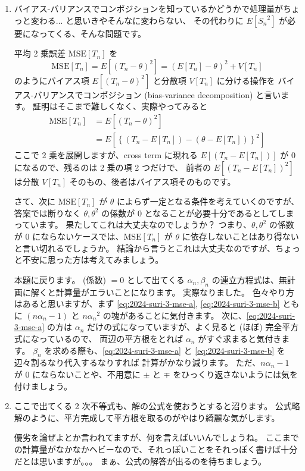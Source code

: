 \documentclass[./main.tex]{subfiles}
\begin{document}
\begin{enumerate}
        \item バイアス-バリアンスでコンポジションを知っているかどうかで処理量がちょっと変わる... と思いきやそんなに変わらない、
        その代わりに $E[ {S_n}^2]$ が必要になってくる、そんな問題です。

        平均 2 乗誤差 $\mathrm{MSE} [T_n]$ を
        \begin{equation*}
            \mathrm{MSE} [T_n] 
                = E [ (T_n - \theta)^2 ] 
                    = ( E [ T_n] - \theta )^2 + V [T_n]
        \end{equation*}
        のようにバイアス項 $E [ (T_n - \theta)^2 ]$ と分散項 $V [T_n]$ に分ける操作を バイアス-バリアンスでコンポジション (bias-variance decomposition) と言います。
        証明はそこまで難しくなく、実際やってみると
        \begin{align*}
            \mathrm{MSE} [T_n] 
                &= E [ (T_n - \theta)^2 ] \\
                &= E \left[ \left\{ (T_n - E[ T_n ]) - (\theta - E[ T_n]) \right\}^2 \right]
        \end{align*}
        ここで 2 乗を展開しますが、cross term に現れる $E[ ( T_n - E [T_n] ) ]$ が $0$ になるので、残るのは 2 乗の項 2 つだけで、
        前者の $E [ (T_n - E[T_n])^2 ]$ は分散 $V [T_n]$ そのもの、後者はバイアス項そのものです。

        さて、次に $\mathrm{MSE} [T_n]$ が $\theta$ によらず一定となる条件を考えていくのですが、
        答案では断りなく $\theta, \theta^2$ の係数が $0$ となることが必要十分であるとしてしまっています。
        果たしてこれは大丈夫なのでしょうか？
        つまり、$\theta, \theta^2$ の係数が $0$ にならないケースでは、$\mathrm{MSE} [T_n]$ が $\theta$ に依存しないことはあり得ないと言い切れるでしょうか。
        結論から言うとこれは大丈夫なのですが、ちょっと不安に思った方は考えてみましょう。

        本題に戻ります。
        (係数) $= 0 $ として出てくる $\alpha_n, \beta_n$ の連立方程式は、無計画に解くと計算量がエラいことになります。
        実際なりました。
        色々やり方はあると思いますが、まず \eqref{eq:2024-suri-3-mse-a}, \eqref{eq:2024-suri-3-mse-b} ともに
        $(n \alpha_n - 1)$ と $n {\alpha_n}^2$ の塊があることに気付きます。
        次に、\eqref{eq:2024-suri-3-mse-a} の方は $\alpha_n$ だけの式になっていますが、よく見ると (ほぼ) 完全平方式になっているので、
        両辺の平方根をとれば $\alpha_n$ がすぐ求まると気付きます。
        $\beta_n$ を求める際も、\eqref{eq:2024-suri-3-mse-a} と \eqref{eq:2024-suri-3-mse-b} を辺々割るなり代入するなりすれば
        計算がかなり減ります。
        ただ、$n \alpha_n - 1$ が $0$ にならないことや、不用意に $\pm$ と $\mp$ をひっくり返さないようには気を付けましょう。

        \item ここで出てくる 2 次不等式も、解の公式を使おうとすると沼ります。
        公式略解のように、平方完成して平方根を取るのがやはり綺麗な気がします。

        優劣を論ぜよとか言われてますが、何を言えばいいんでしょうね。
        ここまでの計算量がなかなかヘビーなので、それっぽいことをそれっぽく書けば十分だとは思いますが。。。
        まぁ、公式の解答が出るのを待ちましょう。
        
    \end{enumerate}
\end{document}
